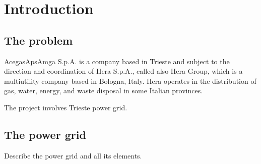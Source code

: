 \chapter{Introduction}

\section{The problem}

AcegasApsAmga S.p.A. is a company based in Trieste and subject to the direction and coordination of Hera S.p.A., called also Hera Group, which is a multiutility company based in Bologna, Italy. Hera operates in the distribution of gas, water, energy, and waste disposal in some Italian provinces.

The project involves Trieste power grid.



\section{The power grid}

Describe the power grid and all its elements.